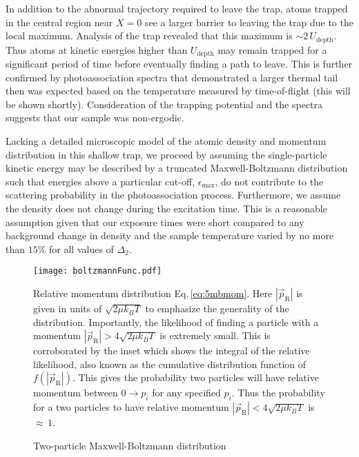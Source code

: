 In addition to the abnormal trajectory required to leave the trap, atoms trapped in the central region near $X=0$ see a larger barrier to leaving the trap due to the local maximum.
Analysis of the trap revealed that this maximum is $\sim 2 \, U_\text{depth}$.
Thus atoms at kinetic energies higher than $U_\text{depth}$ may remain trapped for a significant period of time before eventually finding a path to leave.
This is further confirmed by photoassociation spectra that demonstrated a larger thermal tail then was expected based on the temperature measured by time-of-flight (this will be shown shortly).
Consideration of the trapping potential and the spectra suggests that our sample was non-ergodic.

Lacking a detailed microscopic model of the atomic density and momentum distribution in this shallow trap, we proceed by assuming the single-particle kinetic energy may be described by a truncated Maxwell-Boltzmann distribution such that energies above a particular cut-off, $\epsilon_\text{max}$, do not contribute to the scattering probability in the photoassociation process.
Furthermore, we assume the density does not change during the excitation time.
This is a reasonable assumption given that our exposure times were short compared to any background change in density and the sample temperature varied by no more than $15$\% for all values of $\Delta_2$.
	\begin{figure} 
		\centerline{
		\texttt{[image: boltzmannFunc.pdf]}}
		\caption{Two-particle Maxwell-Boltzmann distribution}{Relative momentum distribution Eq.\,\ref{eq:5mbmom}. Here $|\vec{p}_\text{R}|$ is given in units of $\sqrt{2 \mu k_B T}$ to emphasize the generality of the distribution. Importantly, the likelihood of finding a particle with a momentum $|\vec{p}_\text{R}| > 4\sqrt{2 \mu k_B T}$ is extremely small. This is corroborated by the inset which shows the integral of the relative likelihood, also known as the cumulative distribution function of $f(|\vec{p}_\text{R}|)$. This gives the probability two particles will have relative momentum between $0 \rightarrow p_i$ for any specified $p_i$. Thus the probability for a two particles to have relative momentum $|\vec{p}_\text{R}| < 4\sqrt{2 \mu k_B T}$ is $\approx\,1$.}
		\label{fig:singleBoltz}
	\end{figure}
	
